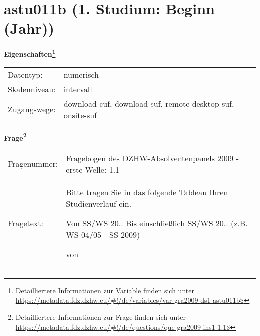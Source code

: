 
    \setcounter{footnote}{0}

    \vspace*{-1.8cm}
	\section{astu011b (1. Studium: Beginn (Jahr))}
	\label{section:astu011b}



    \vspace*{0.5cm}
    \noindent\textbf{Eigenschaften\footnote{Detailliertere Informationen zur Variable finden sich unter
		\url{https://metadata.fdz.dzhw.eu/\#!/de/variables/var-gra2009-ds1-astu011b$}}}\\
	\begin{tabularx}{\hsize}{@{}lX}
	Datentyp: & numerisch \\
	Skalenniveau: & intervall \\
	Zugangswege: &
	  download-cuf, 
	  download-suf, 
	  remote-desktop-suf, 
	  onsite-suf
 \\
    \end{tabularx}



				\vspace*{0.5cm}
                \noindent\textbf{Frage\footnote{Detailliertere Informationen zur Frage finden sich unter
		              \url{https://metadata.fdz.dzhw.eu/\#!/de/questions/que-gra2009-ins1-1.1$}}}\\
				\begin{tabularx}{\hsize}{@{}lX}
					Fragenummer: &
					  Fragebogen des DZHW-Absolventenpanels 2009 - erste Welle:
					  1.1
 \\
					Fragetext: & Bitte tragen Sie in das folgende Tableau Ihren Studienverlauf ein.\par  Von SS/WS 20.. Bis einschließlich SS/WS 20.. (z.B. WS 04/05 - SS 2009)\par  von \\
				\end{tabularx}





